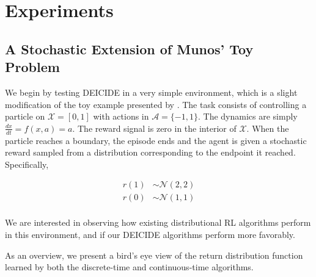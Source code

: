 \section{Experiments}\label{s:experiments}
\subsection{A Stochastic Extension of Munos' Toy Problem}
We begin by testing DEICIDE in a very simple environment, which is a
slight modification of the toy example presented by
\citet{Munos2004ASO}. The task consists of controlling a particle on
$\mathcal{X} = [0,1]$ with actions in $\mathcal{A} = \{-1, 1\}$. The
dynamics are simply $\frac{dx}{dt} = f(x, a) = a$. The reward signal
is zero in the interior of $\mathcal{X}$. When the particle reaches a
boundary, the episode ends and the agent is given a stochastic reward
sampled from a distribution corresponding to the endpoint it
reached. Specifically,

\begin{align*}
  r(1) &\sim \mathcal{N}(2, 2)\\
  r(0) &\sim \mathcal{N}(1, 1)\\
\end{align*}

We are interested in observing how existing distributional RL
algorithms perform in this environment, and if our DEICIDE algorithms
perform more favorably.

As an overview, we present a bird's eye view of the return
distribution function learned by both the discrete-time and
continuous-time algorithms.

